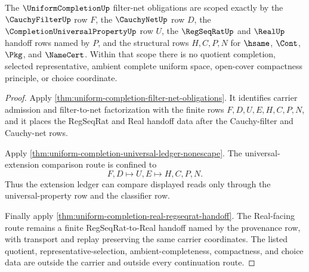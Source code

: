 \begin{theorem}
\label{thm:uniform-completion-scope-lock}
The $\UniformCompletionUp$ filter-net obligations are scoped exactly by the $\CauchyFilterUp$ row $F$, the $\CauchyNetUp$ row $D$, the $\CompletionUniversalPropertyUp$ row $U$, the $\RegSeqRatUp$ and $\RealUp$ handoff rows named by $P$, and the structural rows $H,C,P,N$ for $\hsame$, $\Cont$, $\Pkg$, and $\NameCert$. Within that scope there is no quotient completion, selected representative, ambient complete uniform space, open-cover compactness principle, or choice coordinate.
\end{theorem}
\begin{proof}
Apply \autoref{thm:uniform-completion-filter-net-obligations}. It identifies carrier admission and filter-to-net factorization with the finite rows $F,D,U,E,H,C,P,N$, and it places the RegSeqRat and Real handoff data after the Cauchy-filter and Cauchy-net rows.

Apply \autoref{thm:uniform-completion-universal-ledger-nonescape}. The universal-extension comparison route is confined to
$$
F,D \longmapsto U,E \longmapsto H,C,P,N .
$$
Thus the extension ledger can compare displayed reads only through the universal-property row and the classifier row.

Finally apply \autoref{thm:uniform-completion-real-regseqrat-handoff}. The Real-facing route remains a finite RegSeqRat-to-Real handoff named by the provenance row, with transport and replay preserving the same carrier coordinates. The listed quotient, representative-selection, ambient-completeness, compactness, and choice data are outside the carrier and outside every continuation route.
\end{proof}

